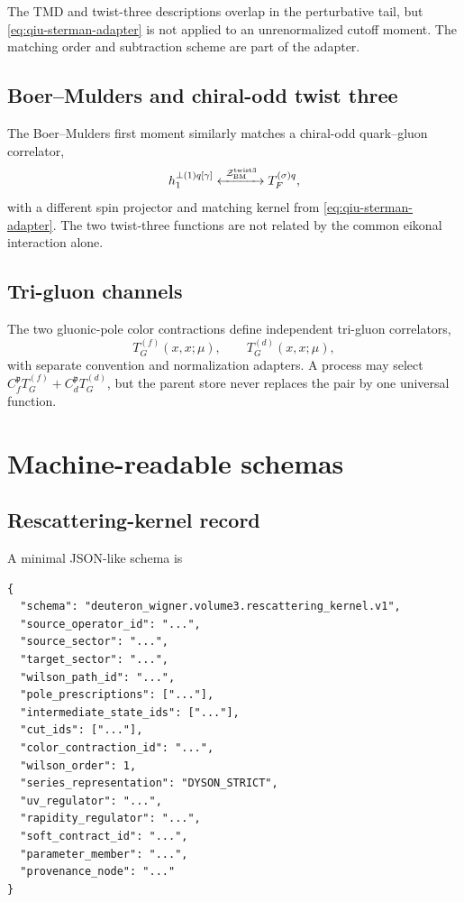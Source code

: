 \documentclass[11pt]{article}
\newcommand{\cZ}{\mathcal Z}
\begin{document}
The TMD and twist-three descriptions overlap in the perturbative tail, but
\cref{eq:qiu-sterman-adapter} is not applied to an unrenormalized cutoff
moment.  The matching order and subtraction scheme are part of the adapter.

\subsection{Boer--Mulders and chiral-odd twist three}

The Boer--Mulders first moment similarly matches a chiral-odd quark--gluon
correlator,
\begin{equation}
 h_1^{\perp(1)q[\gamma]}
 \xleftrightarrow{\ \cZ_{\rm BM}^{\rm twist3}\ }
 T_F^{(\sigma)q},
\label{eq:boer-mulders-twist3}
\end{equation}
with a different spin projector and matching kernel from
\cref{eq:qiu-sterman-adapter}.  The two twist-three functions are not related
by the common eikonal interaction alone.

\subsection{Tri-gluon channels}

The two gluonic-pole color contractions define independent tri-gluon
correlators,
\begin{equation}
 T_G^{(f)}(x,x;\mu),
 \qquad
 T_G^{(d)}(x,x;\mu),
\label{eq:tri-gluon-functions}
\end{equation}
with separate convention and normalization adapters.  A process may select
\(C_f^{\mathfrak p}T_G^{(f)}+C_d^{\mathfrak p}T_G^{(d)}\), but the parent
store never replaces the pair by one universal function.

\section{Machine-readable schemas}
\label{app:schemas}

\subsection{Rescattering-kernel record}

A minimal JSON-like schema is
\begin{verbatim}
{
  "schema": "deuteron_wigner.volume3.rescattering_kernel.v1",
  "source_operator_id": "...",
  "source_sector": "...",
  "target_sector": "...",
  "wilson_path_id": "...",
  "pole_prescriptions": ["..."],
  "intermediate_state_ids": ["..."],
  "cut_ids": ["..."],
  "color_contraction_id": "...",
  "wilson_order": 1,
  "series_representation": "DYSON_STRICT",
  "uv_regulator": "...",
  "rapidity_regulator": "...",
  "soft_contract_id": "...",
  "parameter_member": "...",
  "provenance_node": "..."
}
\end{verbatim}
\end{document}
